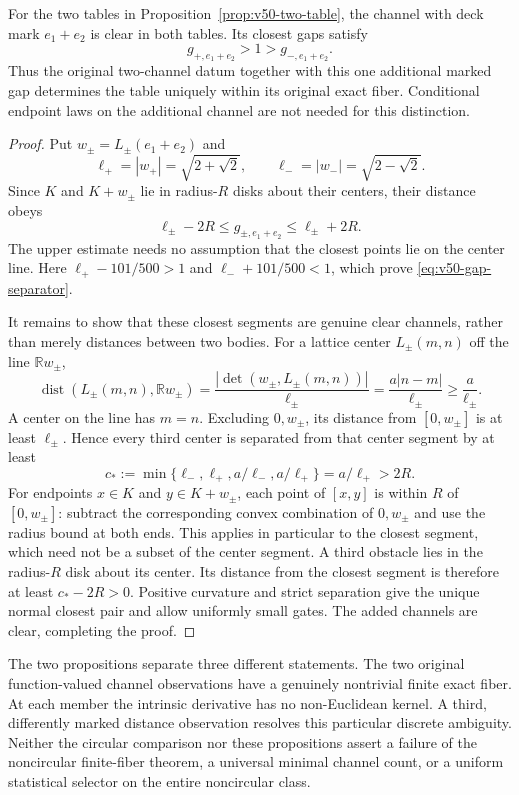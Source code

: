 \begin{proposition}
\label{prop:v50-extra-gap}
For the two tables in Proposition~\ref{prop:v50-two-table}, the
channel with deck mark $e_1+e_2$ is clear in both tables.  Its closest
gaps satisfy
\begin{equation}\label{eq:v50-gap-separator}
             g_{+,e_1+e_2}>1>g_{-,e_1+e_2}.
\end{equation}
Thus the original two-channel datum together with this one additional
marked gap determines the table uniquely within its original exact
fiber.  Conditional endpoint laws on the additional channel are not
needed for this distinction.
\end{proposition}
\begin{proof}
Put $w_\pm=L_\pm(e_1+e_2)$ and
\[
        \ell_+=|w_+|=\sqrt{2+\sqrt2},\qquad
        \ell_-=|w_-|=\sqrt{2-\sqrt2}.
\]
Since $K$ and $K+w_\pm$ lie in radius-$R$ disks about their
centers, their distance obeys
\begin{equation}\label{eq:v50-gap-distance-bounds}
        \ell_\pm-2R\le g_{\pm,e_1+e_2}\le\ell_\pm+2R.
\end{equation}
The upper estimate needs no assumption that the closest points lie
on the center line.  Here
$\ell_+-101/500>1$ and $\ell_-+101/500<1$, which prove
\eqref{eq:v50-gap-separator}.

It remains to show that these closest segments are genuine clear
channels, rather than merely distances between two bodies.  For a
lattice center $L_\pm(m,n)$ off the line $\mathbb Rw_\pm$,
\[
 \operatorname{dist}(L_\pm(m,n),\mathbb Rw_\pm)
     =\frac{|\det(w_\pm,L_\pm(m,n))|}{\ell_\pm}
     =\frac{a|n-m|}{\ell_\pm}\ge\frac a{\ell_\pm}.
\]
A center on the line has $m=n$.  Excluding $0,w_\pm$, its distance
from $[0,w_\pm]$ is at least $\ell_\pm$.  Hence every third
center is separated from that center segment by at least
\[
 c_*:=\min\{\ell_-,\ell_+,a/\ell_-,a/\ell_+\}
                   =a/\ell_+>2R.
\]
For endpoints $x\in K$ and $y\in K+w_\pm$, each point of
$[x,y]$ is within $R$ of $[0,w_\pm]$: subtract the corresponding
convex combination of $0,w_\pm$ and use the radius bound at both
ends.  This applies in particular to the closest segment, which need
not be a subset of the center segment.  A third obstacle lies in the
radius-$R$ disk about its center.  Its distance from the closest
segment is therefore at least $c_*-2R>0$.  Positive curvature and
strict separation give the unique normal closest pair and allow
uniformly small gates.  The added channels are clear, completing
the proof.
\end{proof}

The two propositions separate three different statements.  The two
original function-valued channel observations have a genuinely
nontrivial finite exact fiber.  At each member the intrinsic derivative
has no non-Euclidean kernel.  A third, differently marked distance
observation resolves this particular discrete ambiguity.  Neither the
circular comparison nor these propositions assert a failure of the
noncircular finite-fiber theorem, a universal minimal channel count,
or a uniform statistical selector on the entire noncircular class.
